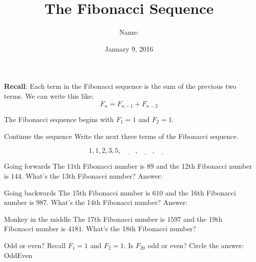 \documentclass[12pt,letterpaper]{article}
\title{The Fibonacci Sequence}
\author{Name: \underline{\hspace{5cm}}}
\date{January 9, 2016}
\begin{document}
\maketitle

\thispagestyle{empty}

\textbf{Recall}: Each term in the Fibonacci sequence is the sum of the previous
two terms. We can write this like: \[
 F_n = F_{n-1} + F_{n-2}
\]

The Fibonacci sequence begins with $F_1 = 1$ and $F_2 = 1$.

\begin{problem}{Continue the sequence}
 Write the next three terms of the Fibonacci sequence.

 \[
  1, 1, 2, 3, 5, \underline{\hspace{2em}}, \underline{\hspace{2em}},
  \underline{\hspace{2em}}
 \]
\end{problem}

\begin{problem}{Going forwards}
 The 11th Fibonacci number is $89$ and the 12th Fibonacci number is $144$.
 What's the 13th Fibonacci number? \hfill Answer: \underline{\hspace{4em}}
\end{problem}

\begin{problem}{Going backwards}
 The 15th Fibonacci number is $610$ and the 16th Fibonacci number is $987$.
 What's the 14th Fibonacci number? \hfill Answer: \underline{\hspace{4em}}
\end{problem}

\begin{problem}{Monkey in the middle}
 The 17th Fibonacci number is $1597$ and the 19th Fibonacci number is $4181$.
 What's the 18th Fibonacci number?
\end{problem}

\begin{problem}{Odd or even?}
 Recall $F_1 = 1$ and $F_2 = 1$. Is $F_{20}$ odd or even? \hfill Circle the
 answer: Odd\hspace{1em}Even
\end{problem}
\end{document}
